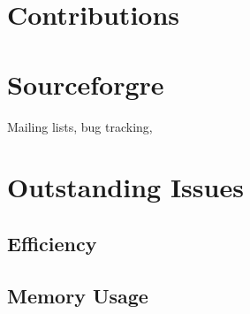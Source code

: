 \section{Contributions}

\section{Sourceforgre}

Mailing lists, bug tracking, 

\section{Outstanding Issues}

\subsection{Efficiency}

\subsection{Memory Usage}